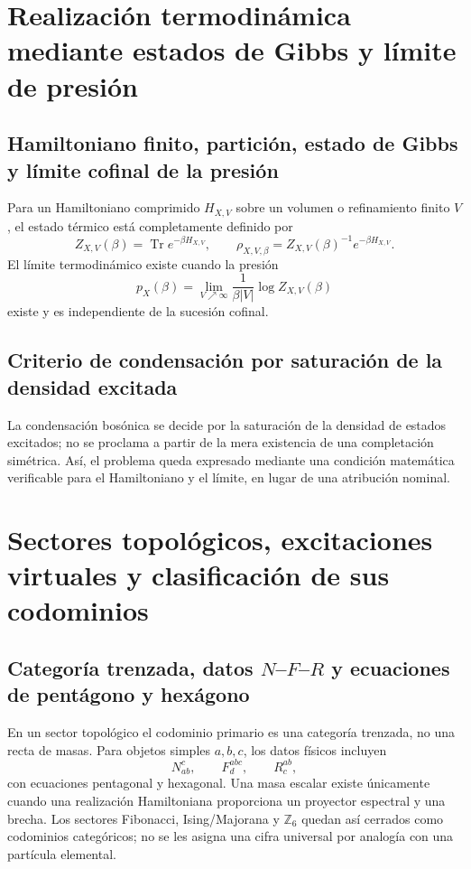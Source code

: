 \section{Realización termodinámica mediante estados de Gibbs y límite de presión}

\subsection{Hamiltoniano finito, partición, estado de Gibbs y límite cofinal de la presión}

Para un Hamiltoniano comprimido \(H_{X,V}\) sobre un volumen o refinamiento
finito \(V\), el estado térmico está completamente definido por
\[
 Z_{X,V}(\beta)=\operatorname{Tr}e^{-\beta H_{X,V}},
 \qquad
 \rho_{X,V,\beta}=Z_{X,V}(\beta)^{-1}e^{-\beta H_{X,V}}.
\]
El límite termodinámico existe cuando la presión
\[
 p_X(\beta)=\lim_{V\nearrow\infty}
 \frac1{\beta |V|}\log Z_{X,V}(\beta)
\]
existe y es independiente de la sucesión cofinal.

\subsection{Criterio de condensación por saturación de la densidad excitada}

La condensación bosónica se
decide por la saturación de la densidad de estados excitados; no se proclama a
partir de la mera existencia de una completación simétrica. Así, el problema
queda expresado mediante una condición matemática verificable para el
Hamiltoniano y el límite, en lugar de una atribución nominal.

\section{Sectores topológicos, excitaciones virtuales y clasificación de sus codominios}

\subsection{Categoría trenzada, datos \texorpdfstring{\(N\)--\(F\)--\(R\)}{N--F--R} y ecuaciones de pentágono y hexágono}

En un sector topológico el codominio primario es una categoría trenzada, no
una recta de masas. Para objetos simples \(a,b,c\), los datos físicos incluyen
\[
 N_{ab}^{c},\qquad F^{abc}_{d},\qquad R^{ab}_{c},
\]
con ecuaciones pentagonal y hexagonal. Una masa escalar existe únicamente
cuando una realización Hamiltoniana proporciona un proyector espectral y una
brecha. Los sectores Fibonacci, Ising/Majorana y \(\mathbb Z_6\) quedan así
cerrados como codominios categóricos; no se les asigna una cifra universal
por analogía con una partícula elemental.

